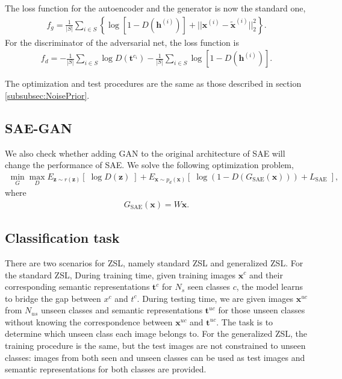 \documentclass{article}
\newcommand{\bb}[1]{\boldsymbol{#1}}
\begin{document}
	The loss function for the autoencoder and the generator is now the standard one,
	\begin{align}
		f_g = \frac{1}{|S|} \sum_{i \in S} \left\{ \log\left[ 1 - D( \bb{h}^{(i)} ) \right] + || \bb{x}^{(i)} - \tilde{\bb{x}}^{(i)} ||_2^2 \right\}.
	\end{align}
	For the discriminator of the adversarial net, the loss function is
	\begin{align}
		f_d = -\frac{1}{|S|} \sum_{i \in S} \log D( \bb{t}^{c_i} ) - \frac{1}{|S|} \sum_{i \in S} \log\left[ 1 - D( \bb{h}^{(i)} ) \right].
	\end{align}
	
	The optimization and test procedures are the same as those described in section \ref{subsubsec:NoisePrior}.




\subsection{SAE-GAN}

	We also check whether adding GAN to the original architecture of SAE will change the performance of SAE. We solve the following optimization problem,
	\begin{align}
		\min_{G} \max_D E_{\bb{z} \sim r(\bb{z})}\left[\; \log D(\bb{z}) \;\right] + E_{\bb{x} \sim p_d(\bb{x})}\left[\; \log( 1 - D(G_{\textrm{SAE}}(\bb{x})) ) + L_{\textrm{SAE}} \;\right],
	\end{align}
	where
	\begin{align}
		G_{\textrm{SAE}}(\bb{x}) = W \bb{x}.
	\end{align}





\subsection{Classification task}

	There are two scenarios for ZSL, namely standard ZSL and generalized ZSL. For the standard ZSL, During training time, given training images $\bb{x}^c$ and their corresponding semantic representations $\bb{t}^c$ for $N_s$ seen classes $c$, the model learns to bridge the gap between $x^c$ and $t^c$. During testing time, we are given images $\bb{x}^{uc}$ from $N_{us}$ unseen classes and semantic representations $\bb{t}^{uc}$ for those unseen classes without knowing the correspondence between $\bb{x}^{uc}$ and $\bb{t}^{uc}$. The task is to determine which unseen class each image belongs to. For the generalized ZSL, the training procedure is the same, but the test images are not constrained to unseen classes: images from both seen and unseen classes can be used as test images and semantic representations for both classes are provided.
\end{document}
